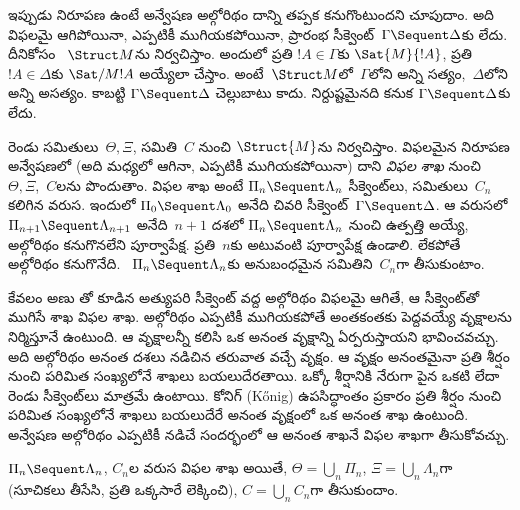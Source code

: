 \documentclass[../../../include/open-logic-section]{subfiles}
\begin{document}


ఇప్పుడు నిరూపణ ఉంటే అన్వేషణ అల్గోరిథం దాన్ని తప్పక కనుగొంటుందని చూపుదాం. అది విఫలమై ఆగిపోయినా, ఎప్పటికీ ముగియకపోయినా, ప్రారంభ సీక్వెంట్~$\Gamma \Sequent \Delta$కు  లేదు. దీనికోసం ~$\Struct M$ను నిర్వచిస్తాం. అందులో ప్రతి $!A \in \Gamma$కు $\Sat{M}{!A}$, ప్రతి~$!A \in \Delta$కు $\Sat/{M}{!A}$ అయ్యేలా చేస్తాం. అంటే~$\Struct M$లో~$\Gamma$లోని అన్ని  సత్యం,~$\Delta$లోని అన్ని  అసత్యం. కాబట్టి $\Gamma \Sequent \Delta$ చెల్లుబాటు కాదు.  నిర్దుష్టమైనది కనుక $\Gamma \Sequent \Delta$కు  లేదు.

 రెండు సమితులు~$\Theta, \Xi$,  సమితి~$C$ నుంచి $\Struct{M}$ను నిర్వచిస్తాం. విఫలమైన నిరూపణ అన్వేషణలో (అది మధ్యలో ఆగినా, ఎప్పటికీ ముగియకపోయినా) దాని \emph{విఫల శాఖ} నుంచి $\Theta, \Xi$,~$C$లను పొందుతాం. విఫల శాఖ అంటే $\Pi_n \Sequent
\Lambda_n$ సీక్వెంట్‌లు,  సమితులు~$C_n$ కలిగిన వరుస. ఇందులో $\Pi_0 \Sequent \Lambda_0$ అనేది చివరి సీక్వెంట్~$\Gamma \Sequent
\Delta$. ఆ వరుసలో $\Pi_{n+1} \Sequent \Lambda_{n+1}$ అనేది~$n+1$ దశలో $\Pi_n
\Sequent \Lambda_n$ నుంచి ఉత్పత్తి అయ్యే, అల్గోరిథం  కనుగొనలేని పూర్వాపేక్ష. ప్రతి~$n$కు అటువంటి పూర్వాపేక్ష ఉండాలి. లేకపోతే అల్గోరిథం  కనుగొనేది. ~$\Pi_n
\Sequent \Lambda_n$కు అనుబంధమైన  సమితిని~$C_n$గా తీసుకుంటాం.

కేవలం అణు తో కూడిన అత్యుపరి సీక్వెంట్ వద్ద అల్గోరిథం విఫలమై ఆగితే, ఆ సీక్వెంట్‌తో ముగిసే శాఖ విఫల శాఖ. అల్గోరిథం ఎప్పటికీ ముగియకపోతే అంతకంతకు పెద్దవయ్యే వృక్షాలను నిర్మిస్తూనే ఉంటుంది. ఆ వృక్షాలన్నీ కలిసి ఒక అనంత వృక్షాన్ని ఏర్పరుస్తాయని భావించవచ్చు. అది అల్గోరిథం అనంత దశలు నడిచిన తరువాత వచ్చే వృక్షం. ఆ వృక్షం అనంతమైనా ప్రతి శీర్షం నుంచి పరిమిత సంఖ్యలోనే శాఖలు బయలుదేరతాయి. ఒక్కో శీర్షానికి నేరుగా పైన ఒకటి లేదా రెండు సీక్వెంట్‌లు మాత్రమే ఉంటాయి. కోనిగ్ (K\H{o}nig) ఉపసిద్ధాంతం ప్రకారం ప్రతి శీర్షం నుంచి పరిమిత సంఖ్యలోనే శాఖలు బయలుదేరే అనంత వృక్షంలో ఒక అనంత శాఖ ఉంటుంది. అన్వేషణ అల్గోరిథం ఎప్పటికీ నడిచే సందర్భంలో ఆ అనంత శాఖనే విఫల శాఖగా తీసుకోవచ్చు.

$\Pi_n \Sequent \Lambda_n$, $C_n$ల వరుస విఫల శాఖ అయితే, $\Theta = \bigcup_n \Pi_n$, $\Xi = \bigcup_n \Lambda_n$గా (సూచికలు తీసేసి, ప్రతి  ఒక్కసారే లెక్కించి), $C =
\bigcup_n C_n$గా తీసుకుందాం.
\end{document}
